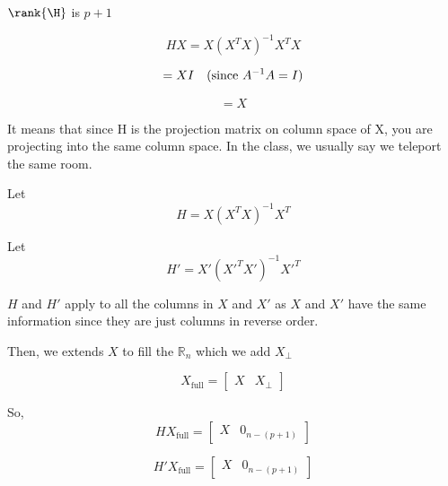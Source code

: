 \documentclass[12pt]{article}
\begin{document}

\begin{enumerate}


$\rank{\H}$ is $p + 1$ 



\[
H X = X (X^T X)^{-1} X^T X
\]

\[
= X I \quad \text{(since \( A^{-1} A = I \))}
\]

\[
= X
\]


It means that since H is the projection matrix on column space of X, you are projecting into the same column space. In the class, we usually say we teleport the same room.


Let
\[
H = X (X^T X)^{-1} X^T
\]

Let
\[
H' = X' (X'^T X')^{-1} X'^T
\]

\( H \) and \( H' \) apply to all the columns in \( X \) and \( X' \) as \( X \) and \( X' \) have the same information since they are just columns in reverse order.

Then, we extends $X$ to fill the $\mathbb{R}_n$ which we add $X_{\perp}$ 

\[
X_{\text{full}} = \begin{bmatrix} X & X_{\perp} \end{bmatrix}
\]

So,
\[
H X_{\text{full}} = \begin{bmatrix} X & 0_{n - (p+1)} \end{bmatrix}
\]

\[
H' X_{\text{full}} = \begin{bmatrix} X & 0_{n - (p+1)} \end{bmatrix}
\]


\end{enumerate}
\end{document}

